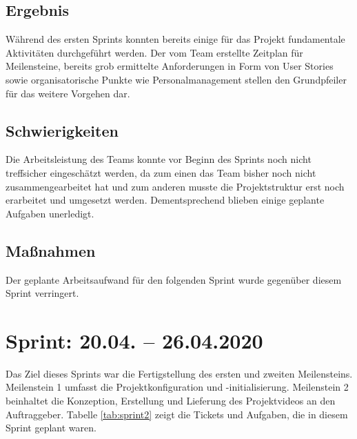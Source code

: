 \documentclass[a4paper,11pt,listof=numbered,glossary=totoc,parskip=half,toc=bib]{scrreprt}
\begin{document}
    \section{Ergebnis}
    Während des ersten Sprints konnten bereits einige für das Projekt fundamentale Aktivitäten durchgeführt werden. Der vom Team erstellte Zeitplan für Meilensteine, bereits grob ermittelte Anforderungen in Form von User Stories sowie organisatorische Punkte wie Personalmanagement stellen den Grundpfeiler für das weitere Vorgehen dar. 
    
    \section{Schwierigkeiten}
    Die Arbeitsleistung des Teams konnte vor Beginn des Sprints noch nicht treffsicher eingeschätzt werden, da zum einen das Team bisher noch nicht zusammengearbeitet hat und zum anderen musste die Projektstruktur erst noch erarbeitet und umgesetzt werden. Dementsprechend blieben einige geplante Aufgaben unerledigt.
    
    \section{Maßnahmen}
    Der geplante Arbeitsaufwand für den folgenden Sprint wurde gegenüber diesem Sprint verringert.
    
    \chapter{Sprint: 20.04. – 26.04.2020}

Das Ziel dieses Sprints war die Fertigstellung des ersten und zweiten Meilensteins. Meilenstein 1 umfasst die Projektkonfiguration und -initialisierung. Meilenstein 2 beinhaltet die Konzeption, Erstellung und Lieferung des Projektvideos an den Auftraggeber. Tabelle \ref{tab:sprint2} zeigt die Tickets und Aufgaben, die in diesem Sprint geplant waren.
\end{document}
